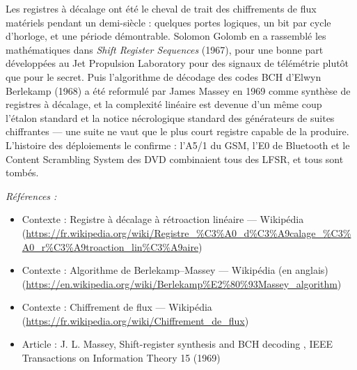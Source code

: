 \documentclass[11pt]{article}
\newenvironment{refs}{\par\small\noindent\emph{Références :}\begin{itemize}\setlength\itemsep{0pt}}{\end{itemize}\normalsize}
\begin{document}
\noindent Les registres à décalage ont été le cheval de trait des chiffrements de
flux matériels pendant un demi-siècle : quelques portes logiques, un bit par cycle d'horloge,
et une période démontrable. Solomon Golomb en a rassemblé les mathématiques dans \textit{Shift
Register Sequences} (1967), pour une bonne part développées au Jet Propulsion Laboratory
pour des signaux de télémétrie plutôt que pour le secret. Puis l'algorithme de décodage des
codes BCH d'Elwyn Berlekamp (1968) a été reformulé par James Massey en 1969 comme synthèse de
registres à décalage, et la complexité linéaire est devenue d'un même coup l'étalon standard
et la notice nécrologique standard des générateurs de suites chiffrantes --- une suite ne vaut
que le plus court registre capable de la produire. L'histoire des déploiements le confirme :
l'A5/1 du GSM, l'E0 de Bluetooth et le Content Scrambling System des DVD combinaient tous des
LFSR, et tous sont tombés.

\begin{refs}
\item Contexte : Registre à décalage à rétroaction linéaire --- Wikipédia (\url{https://fr.wikipedia.org/wiki/Registre_%C3%A0_d%C3%A9calage_%C3%A0_r%C3%A9troaction_lin%C3%A9aire})
\item Contexte : Algorithme de Berlekamp--Massey --- Wikipédia (en anglais) (\url{https://en.wikipedia.org/wiki/Berlekamp%E2%80%93Massey_algorithm})
\item Contexte : Chiffrement de flux --- Wikipédia (\url{https://fr.wikipedia.org/wiki/Chiffrement_de_flux})
\item Article : J. L. Massey, \og{} Shift-register synthesis and BCH decoding \fg{}, IEEE Transactions on Information Theory 15 (1969)
\end{refs}

\bigskip
\end{document}
